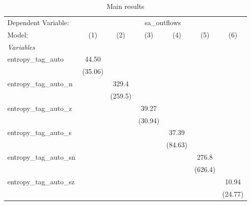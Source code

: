 
\begin{table}[htbp]
   \centering
   \footnotesize
   \begin{threeparttable}[b]
      \caption{\label{tab:reg_sa_outflows_tag_auto.tex} Main results}
      \begin{tabular}{lcccccc}
         \tabularnewline \midrule \midrule
         Dependent Variable: & \multicolumn{6}{c}{sa\_outflows}\\
         Model:                    & (1)           & (2)           & (3)           & (4)           & (5)           & (6)\\  
         \midrule
         \emph{Variables}\\
         entropy\_tag\_auto        & 44.50         &               &               &               &               &   \\   
                                   & (35.06)       &               &               &               &               &   \\   
         entropy\_tag\_auto\_n     &               & 329.4         &               &               &               &   \\   
                                   &               & (259.5)       &               &               &               &   \\   
         entropy\_tag\_auto\_z     &               &               & 39.27         &               &               &   \\   
                                   &               &               & (30.94)       &               &               &   \\   
         entropy\_tag\_auto\_s     &               &               &               & 37.39         &               &   \\   
                                   &               &               &               & (84.63)       &               &   \\   
         entropy\_tag\_auto\_sn    &               &               &               &               & 276.8         &   \\   
                                   &               &               &               &               & (626.4)       &   \\   
         entropy\_tag\_auto\_sz    &               &               &               &               &               & 10.94\\   
                                   &               &               &               &               &               & (24.77)\\   

\end{tabular}
\end{threeparttable}
\end{table}
